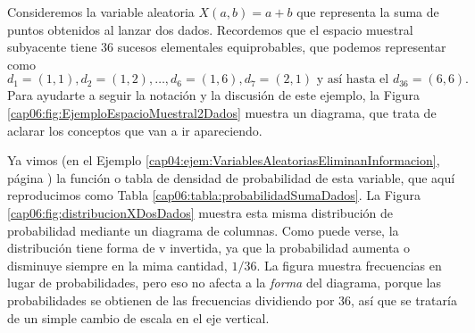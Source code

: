 \begin{ejemplo}
\label{cap06:ejem:DistribucionMediaMuestral}
    Consideremos la variable aleatoria $X(a,b)=a+b$ que representa la suma de puntos obtenidos al
    lanzar dos dados. Recordemos que el espacio muestral subyacente tiene 36 sucesos elementales
    equiprobables, que podemos representar como
        \[d_1=(1,1), d_2=(1,2),\ldots,d_6=(1,6),d_7=(2,1)\mbox{ y así hasta el }d_{36}=(6,6).\]
    Para ayudarte a seguir la notación y la discusión de este ejemplo, la Figura
    \ref{cap06:fig:EjemploEspacioMuestral2Dados} muestra un diagrama, que trata de aclarar los
    conceptos que van a ir apareciendo.

    Ya vimos (en el Ejemplo \ref{cap04:ejem:VariablesAleatoriasEliminanInformacion}, página
    \pageref{cap04:ejem:VariablesAleatoriasEliminanInformacion}) la función o tabla de densidad de
    probabilidad de esta variable, que aquí reproducimos como Tabla
    \ref{cap06:tabla:probabilidadSumaDados}. La Figura \ref{cap06:fig:distribucionXDosDados}
    muestra esta misma distribución de probabilidad mediante un diagrama de columnas. Como puede
    verse, la distribución tiene forma de v invertida, ya que la probabilidad aumenta o disminuye
    siempre en la mima cantidad, $1/36$. La figura muestra frecuencias en lugar de probabilidades,
    pero eso no afecta  a la {\em forma} del diagrama, porque las probabilidades se obtienen de las
    frecuencias dividiendo por 36, así que se trataría de un simple cambio de escala en el eje
    vertical.


\end{ejemplo}
